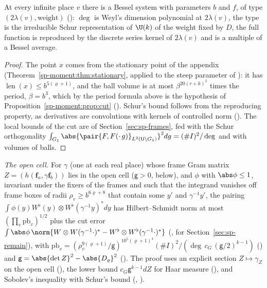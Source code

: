 \begin{theorem}\label{sp-moment:thm:system}
At every infinite place $v$ there is a Bessel system with parameters $b$ and $f$, of type
$(2\lambda(v),\text{weight})$ (): $\deg$ is Weyl's dimension
polynomial at $2\lambda(v)$, the type is the irreducible Schur representation of $\U(k)$ of the weight
fixed by $D$, the full function is reproduced by the discrete series kernel of $2\lambda(v)$ and is a
multiple of a Bessel average.
\end{theorem}

\begin{proof}
The point $x$ comes from the stationary point of the appendix
(Theorem~\ref{sp-moment:thm:stationary}, applied to the steep parameter of
): it has $\operatorname{len}(x)\le b^{5(\varrho+1)}$, and the ball volume is at most
$\beta^{20(r+k)^2}$ times the period, $\beta=b^3$, which by the period formula above is the hypothesis
of Proposition~\ref{sp-moment:prop:cut} (). Schur's
bound follows from the reproducing property, as derivatives are convolutions with kernels of
controlled norm (). The local bounds of the
cut are  of Section~\ref{sec:sp-frames}, fed
with the Schur orthogonality $\int_{G_1}\abs{\pair{F,F(\cdot\,g)}_{L^2(\mathsf U\backslash G_1)}}^2dg
=(\#I)^2/\deg$ and with volumes of balls.
\end{proof}

\emph{The open cell.} For $\gamma$ (one at each real place) whose frame Gram matrix
$Z=(h(\mathbf f_a,\gamma\mathbf f_b))$ lies in the open cell ($\mathsf g>0$, below), and $\phi$ with
$\abs\phi\le1$, invariant under the fixers of the frames and such that the integrand vanishes off
frame boxes of radii $\rho_v\ge b^{6\varrho+8}$ that contain some $y'$ and $\gamma^{-1}y'$, the
pairing $\int\phi(y)W^\flat(y)\otimes W^\flat(\gamma^{-1}y)^*dy$ has Hilbert--Schmidt
norm at most $(\prod_v\mathrm{pb}_v)^{1/2}$ plus the cut error $\int\abs\phi\,\norm{W\otimes
W(\gamma^{-1}\cdot)^*-W^\flat\otimes W^\flat(\gamma^{-1}\cdot)^*}$
(, for Section~\ref{sec:sp-remain}), with
$\mathrm{pb}_v=(\rho_v^{9(\varrho+1)}/\mathsf g)^{10^5(\varrho+1)^4}(\#I)^2/(\deg\,c_G\,
(\mathsf g/2)^{k-1})$ () and $\mathsf g=\abs{\det Z}^2-\abs{D_\varrho}^2$
(). The proof uses an explicit section $Z\mapsto\gamma_Z$ on the open cell
(), the lower bound $c_G\mathsf g^{k-1}dZ$ for Haar
measure (), and Sobolev's inequality with Schur's bound
(, ).

